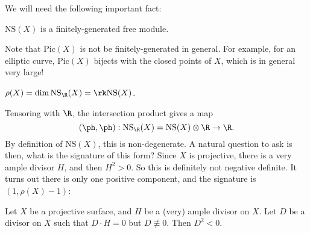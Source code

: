 \documentclass[a4paper]{article}
\newcommand\Pic{\mathrm{Pic}}
\newcommand\NS{\mathrm{NS}}
\begin{document}
We will need the following important fact:
\begin{fact}
  $\NS(X)$ is a finitely-generated free module.
\end{fact}
Note that $\Pic(X)$ is not be finitely-generated in general. For example, for an elliptic curve, $\Pic(X)$ bijects with the closed points of $X$, which is in general very large!

\begin{defi}[$\rho(X)$]
  $\rho(X) = \dim \NS_\R(X) = \rk \NS(X)$.
\end{defi}

Tensoring with $\R$, the intersection product gives a map
\[
  (\ph, \ph): \NS_\R(X) = \NS(X)\otimes \R \to \R.
\]
By definition of $\NS(X)$, this is non-degenerate. A natural question to ask is then, what is the signature of this form? Since $X$ is projective, there is a very ample divisor $H$, and then $H^2 > 0$. So this is definitely not negative definite. It turns out there is only one positive component, and the signature is $(1, \rho(X) - 1)$:

\begin{thm}
  Let $X$ be a projective surface, and $H$ be a (very) ample divisor on $X$. Let $D$ be a divisor on $X$ such that $D \cdot H = 0$ but $D \not \equiv 0$. Then $D^2 < 0$.
\end{thm}
\end{document}
